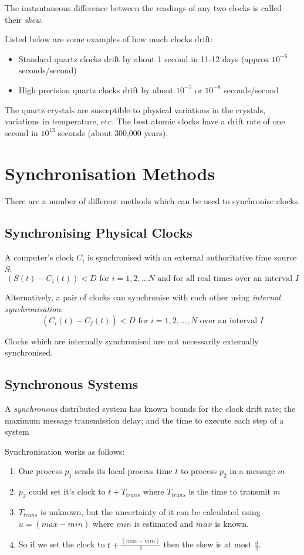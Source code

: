 The instantaneous difference between the readings of any two clocks is called their \textit{skew}.

Listed below are some examples of how much clocks drift:
\begin{itemize}
    \item Standard quartz clocks drift by about 1 second in 11-12 days (approx $10^{-6}$ seconds/second)
    \item High precision quartz clocks drift by about $10^{-7}$ or $10^{-8}$ seconds/second
\end{itemize}

The quartz crystals are susceptible to physical variations in the crystals, variations in temperature, etc. The best atomic clocks have a drift rate of one second in $10^{13}$ seconds (about 300,000 years).

\section{Synchronisation Methods}
There are a number of different methods which can be used to synchronise clocks.

\subsection{Synchronising Physical Clocks}
A computer's clock $C_i$ is synchronised with an external authoritative time source $S$:
\[(S(t) - C_i(t)) < D \textrm{ for } i=1, 2, \ldots N \textrm{ and for all real times over an interval } I\]

Alternatively, a pair of clocks can synchronise with each other using \textit{internal synchronisation}:
\[(C_i(t) - C_j(t)) < D \textrm{ for } i = 1, 2, \ldots, N \textrm{ over an interval } I\]

Clocks which are internally synchronised are not necessarily externally synchronised.

\subsection{Synchronous Systems}
A \textit{synchronous} distributed system has known bounds for the clock drift rate; the maximum message transmission delay; and the time to execute each step of a system

Synchronisation works as follows:
\begin{enumerate}
    \item One process $p_1$ sends its local process time $t$ to process $p_2$ in a message $m$
    \item $p_2$ could set it's clock to $t+T_{trans}$ where $T_{trans}$ is the time to transmit $m$
    \item $T_{trans}$ is unknown, but the uncertainty of it can be calculated using $u=(max-min)$ where $min$ is estimated and $max$ is known.
    \item So if we set the clock to $t+ \frac{(max-min)}{2}$ then the skew is at most $\frac{u}{2}$.
\end{enumerate}

